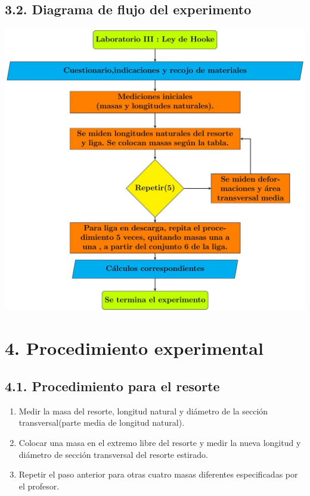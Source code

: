 \documentclass[10pt]{article}
\begin{document}
\subsection*{3.2. Diagrama de flujo del experimento}
\begin{center}
\includegraphics[max width=\textwidth]{2025_04_28_a9941da8947ada55c6c9g-10}
\end{center}

\section*{4. Procedimiento experimental}
\subsection*{4.1. Procedimiento para el resorte}
\begin{enumerate}
  \item Medir la masa del resorte, longitud natural y diámetro de la sección transversal(parte media de longitud natural).
\end{enumerate}

\begin{enumerate}
  \setcounter{enumi}{1}
  \item Colocar una masa en el extremo libre del resorte y medir la nueva longitud y diámetro de sección transversal del resorte estirado.
  \item Repetir el paso anterior para otras cuatro masas diferentes especificadas por el profesor.
\end{enumerate}
\end{document}
